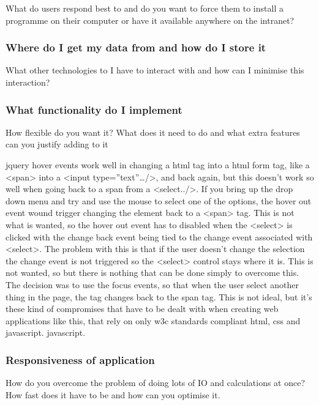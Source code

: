 \documentclass[11pt]{article}
\begin{document}
What do users respond best to and do you want to force them to install
a programme on their computer or have it available anywhere on the intranet?
\subsubsection{Where do I get my data from and how do I store it}
\label{sec-2_2_7}

What other technologies to I have to interact with and how can I
minimise this interaction?
\subsubsection{What functionality do I implement}
\label{sec-2_2_8}

How flexible do you want it?  What does it need to do and what extra
features can you justify adding to it

jquery hover events work well in changing a html tag into a html form
tag, like a <span> into a <input type=''text''\ldots{}/>, and back again, but
this doesn't work so well when going back to a span from a
<select../>.  If you bring up the drop down menu and try and use the
mouse to select one of the options, the hover out event wound trigger
changing the element back to a <span> tag.  This is not what is
wanted, so the hover out event has to disabled when the <select> is
clicked with the change back event being tied to the change event
associated with <select>.  The problem with this is that if the user
doesn't change the selection the change event is not triggered so the
<select> control stays where it is.  This is not wanted, so but there
is nothing that can be done simply to overcome this.  The decision was
to use the focus events, so that when the user select another thing in
the page, the tag changes back to the span tag.  This is not ideal,
but it's these kind of compromises that have to be dealt with when
creating web applications like this, that rely on only w3c standards
compliant html, css and javascript.
javascript.
\subsubsection{Responsiveness of application}
\label{sec-2_2_9}

How do you overcome the problem of doing lots of IO and calculations
at once?  How fast does it have to be and how can you optimise it.
\end{document}
